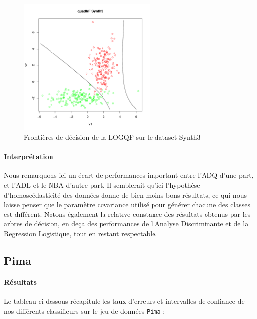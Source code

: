 \documentclass{report}
\begin{document}
\begin{figure}[ht!]
\begin{center}
    \includegraphics[width=0.6\textwidth]{results/quadlrf/quadlrf-Synth3.pdf}
    \caption{Frontières de décision de la LOGQF sur le dataset Synth3}
\end{center}
\end{figure}

\clearpage
\paragraph{Interprétation}
Nous remarquons ici un écart de performances important entre l'ADQ d'une part, et l'ADL et le NBA d'autre part. Il semblerait qu'ici l'hypothèse d'homoscédasticité des données donne de bien moins bons résultats, ce qui nous laisse penser que le paramètre covariance utilisé pour générer chacune des classes est différent. Notons également la relative constance des résultats obtenus par les arbres de décision, en deça des performances de l'Analyse Discriminante et de la Regression Logistique, tout en restant respectable.

\newpage
\subsection{Pima}
\paragraph{Résultats}
Le tableau ci-dessous récapitule les taux d'erreurs et intervalles de confiance de nos différents classifieurs sur le jeu de données \verb+Pima+ :
\end{document}
